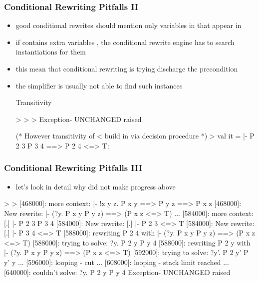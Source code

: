 \begin{frame}[fragile]
\frametitle{Conditional Rewriting Pitfalls II}

\begin{itemize}
\item good conditional rewrites  should mention only variables in  that appear in 
\item if  contains extra variables , the conditional rewrite engine has to search instantiations for them
\item this mean that conditional rewriting is trying discharge the precondition 
\item the simplifier is usually not able to find such instances

\begin{exampleblock}{Transitivity}
\begin{semiverbatim}\scriptsize
> 
> 
> 
Exception- UNCHANGED raised

(* However transitivity of < build in via decision procedure *)
> 
val it = |- P 2 3 \holAnd{} P 3 4 ==> P 2 4 <=> T:
\end{semiverbatim}
\end{exampleblock}
\end{itemize}
\end{frame}

\begin{frame}[fragile]
\frametitle{Conditional Rewriting Pitfalls III}

\begin{itemize}
\item let's look in detail why  did not make progress above
\end{itemize}

\begin{semiverbatim}\scriptsize
> 
> 
[468000]:   more context: |- !x y z. P x y ==> P y z ==> P x z
[468000]:   New rewrite: |- (?y. P x y \holAnd{} P y z) ==> (P x z <=> T)
...
[584000]:   more context:  [.] |- P 2 3 \holAnd{} P 3 4
[584000]:   New rewrite:  [.] |- P 2 3 <=> T
[584000]:   New rewrite:  [.] |- P 3 4 <=> T
[588000]:   rewriting P 2 4 with |- (?y. P x y \holAnd{} P y z) ==> (P x z <=> T)
[588000]:   trying to solve: ?y. P 2 y \holAnd{} P y 4
[588000]:   rewriting P 2 y with |- (?y. P x y \holAnd{} P y z) ==> (P x z <=> T)
[592000]:   trying to solve: ?y'. P 2 y' \holAnd{} P y' y
...
[596000]:   looping - cut
...
[608000]:   looping - stack limit reached
...
[640000]:   couldn't solve: ?y. P 2 y \holAnd{} P y 4
Exception- UNCHANGED raised
\end{semiverbatim}
\end{frame}



